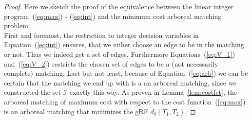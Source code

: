 \begin{proof}Here we sketch the proof of the equivalence between the linear integer program~(\ref{eq:max}) - (\ref{eq:int}) and the minimum cost arboreal matching problem.\\
First and foremost, the restriction to integer decision variables in Equation~(\ref{eq:int}) ensures, that we either choose an edge to be in the matching or not. Thus we indeed get a set of edges. Furthermore Equations~(\ref{eq:V_1}) and~(\ref{eq:V_2}) restricts the chosen set of edges to be a (not necessarily complete) matching. Last but not least, because of Equation~(\ref{eq:arb}) we can be certain that the matching we end up with is a an arboreal matching, since we constructed the set $\mathcal{I}$ exactly this way. As proven in Lemma~\ref{lem:costfct}, the arboreal matching of maximum cost with respect to the cost function~(\ref{eq:max}) is an arboreal matching that minimizes the gRF $d_{\delta}(T_1, T_2)$.
\end{proof}